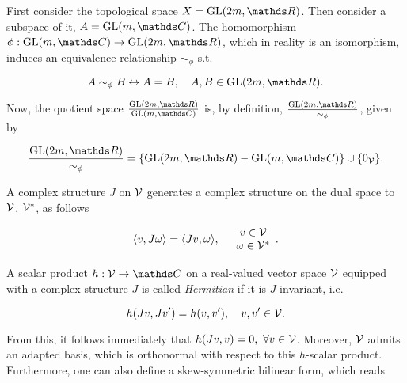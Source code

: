 \begin{remark}
    \textnormal{First consider the topological space }$X = \generallineargroup(2m,\R)$. \textnormal{Then consider a subspace of it, } $A = \generallineargroup(m,\C)$. \textnormal{The homomorphism } $\phi: \generallineargroup(m,\C) \rightarrow \generallineargroup(2m,\R)$, \textnormal{which in reality is an isomorphism, induces an equivalence relationship } $\sim_{\phi}$ s.t. 
    
    $$
        A \sim_{\phi} B \leftrightarrow A = B, \quad A,B \in \generallineargroup(2m,\R).
    $$
    
   \textnormal{Now, the quotient space } $\frac{\generallineargroup(2m,\R)}{\generallineargroup(m,\C)}$ \textnormal{is, by definition, } $\frac{\generallineargroup(2m,\R)}{\sim_{\phi}}$, \textnormal{given by }
    
    \begin{equation}
        \frac{\generallineargroup(2m,\R)}{\sim_{\phi}} = \{\generallineargroup(2m,\R) - \generallineargroup(m,\C)\} \cup \{0_{\vectorspace}\}.
    \end{equation}
\end{remark}

\bigbreak

A complex structure $J$ on $\mathcal{V}$ generates a complex structure on the dual space to $\mathcal{V}$, $\mathcal{V}^{*}$, as follows 

\begin{equation}
    \langle v, J \omega \rangle = \langle Jv, \omega \rangle, \quad \begin{array}{cc}
         v \in \mathcal{V} \\
         \omega \in \mathcal{V}^{*}
    \end{array}.
\end{equation}

\begin{df}
    \textnormal{A scalar product $h: \vectorspace \rightarrow \C$ on a real-valued vector space $\mathcal{V}$ equipped with a complex structure $J$ is called \textit{Hermitian} if it is $J$-invariant, i.e.}

    \begin{equation}
        h(Jv, Jv') = h(v, v'), \quad v,v' \in \mathcal{V}.
    \end{equation}

\end{df}

\blanky \bigbreak

From this, it follows immediately that $h(Jv, v) = 0, \textnormal{ } \forall v \in \mathcal{V}$. Moreover, $\mathcal{V}$ admits an adapted basis, which is orthonormal with respect to this $h$-scalar product. Furthermore, one can also define a skew-symmetric bilinear form, which reads

